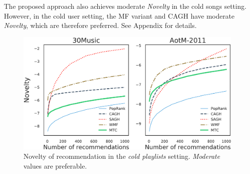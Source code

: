 The proposed approach also achieves moderate \emph{Novelty} in the cold songs setting.
However, in the cold user setting, the MF variant and CAGH have moderate \emph{Novelty},
which are therefore preferred. See Appendix for details.


%



\begin{figure}[!t]
    \centering
    \includegraphics[width=\columnwidth]{fig/nov3.pdf}
    \caption{Novelty of recommendation in the \emph{cold playlists} setting.
\emph{Moderate} values are preferable.}
    \label{fig:nov3}
\end{figure}


